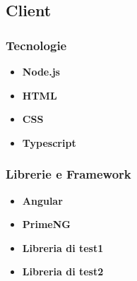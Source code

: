 \subsection{Client}

\subsubsection{Tecnologie}

\begin{itemize}
	\item \textbf{Node.js}
	\item \textbf{HTML}
	\item \textbf{CSS}
	\item \textbf{Typescript}

\end{itemize}

\subsubsection{Librerie e Framework}

\begin{itemize}
	\item \textbf{Angular}
	\item \textbf{PrimeNG}
	\item \textbf{Libreria di test1}
	\item \textbf{Libreria di test2}
	
\end{itemize}